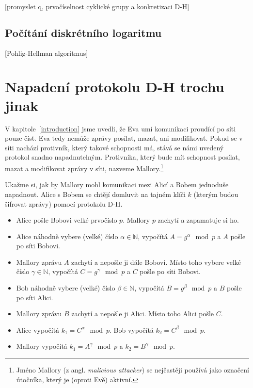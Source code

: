 \documentclass[12pt]{article}
\begin{document}
        [promyslet q, prvočíselnost cyklické grupy a konkretizaci D-H]


        \subsection{Počítání diskrétního logaritmu}\label{subsec:counting-discrete-log}

        [Pohlig-Hellman algoritmus]


    

\section{Napadení protokolu D-H trochu jinak}


    V kapitole~\ref{introduction} jsme uvedli, že Eva umí komunikaci proudící po síti pouze číst. Eva tedy nemůže zprávy posílat, mazat, ani modifikovat.
    Pokud se v síti nachází protivník, který takové schopnosti má, stává se námi uvedený protokol snadno napadnutelným. Protivníka, který bude mít
    schopnost posílat, mazat a modifikovat zprávy v síti, nazveme Mallory.\footnote{Jméno Mallory (z angl. \emph{malicious attacker}) se nejčastěji používá jako
    označení útočníka, který je (oproti Evě) aktivní.}

    \bigskip

    Ukažme si, jak by Mallory mohl komunikaci mezi Alicí a Bobem jednoduše napadnout.
    Alice s Bobem se chtějí domluvit na tajném klíči $k$ (kterým budou šifrovat zprávy) pomocí protokolu D-H.

        \begin{itemize}
            \item
                Alice pošle Bobovi velké prvočíslo $p$.
                Mallory $p$ zachytí a zapamatuje si ho.
            \item
                Alice náhodně vybere (velké) číslo $\alpha \in \mathbb{N}$, vypočítá $A=g^\alpha \mod{p}$ a $A$ pošle po síti Bobovi.
            \item
                Mallory zprávu $A$ zachytí a nepošle ji dále Bobovi. Místo toho vybere velké číslo $\gamma \in \mathbb{N}$,
                vypočítá $C=g^\gamma \mod{p}$ a $C$ pošle po síti Bobovi.
            \item
                Bob náhodně vybere (velké) číslo $\beta \in \mathbb{N}$, vypočítá $B=g^\beta \mod{p}$ a $B$ pošle po síti Alici.
            \item
                Mallory zprávu $B$ zachytí a nepošle ji Alici. Místo toho Alici pošle $C$.
            \item
                Alice vypočítá $k_1=C^\alpha \mod{p}$. Bob vypočítá $k_2=C^\beta \mod{p}$.
            \item
                Mallory vypočítá $k_1=A^\gamma \mod{p}$ a $k_2=B^\gamma \mod{p}$.

        \end{itemize}
\end{document}
